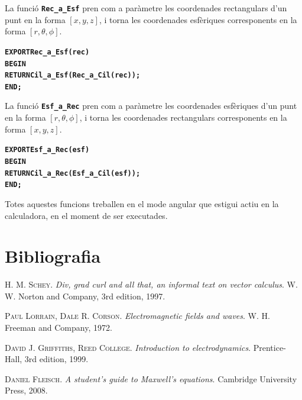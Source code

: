 \documentclass[catalan,a4paper,twoside,11pt]{article}
\begin{document}
La funció \texttt{\textbf{Rec\_a\_Esf}} pren com a paràmetre les coordenades rectangulars  d'un punt en la forma $[x,y,z]$, i torna les coordenades esfèriques corresponents en la forma $[r,\theta,\phi]$.
\vspace{-6mm}
\begin{alltt}
\bfseries
    EXPORT Rec\_a\_Esf(rec)
    BEGIN
      RETURN Cil\_a\_Esf(Rec\_a\_Cil(rec));
    END;
\end{alltt}

La funció \texttt{\textbf{Esf\_a\_Rec}} pren com a paràmetre les coordenades esfèriques d'un punt en la forma $[r,\theta,\phi]$, i torna les coordenades rectangulars corresponents en la forma $[x,y,z]$.
\vspace{-6mm}
\begin{alltt}
\bfseries
    EXPORT Esf\_a\_Rec(esf)
    BEGIN
      RETURN Cil\_a\_Rec(Esf\_a\_Cil(esf));
    END;
\end{alltt}


Totes aquestes funcions treballen en el mode angular que estigui actiu en la calculadora, en el moment de ser executades.



\section{Bibliografia}

\textsc{H. M. Schey}. \textsl{Div, grad curl and all that, an informal text on vector calculus}.  W. W. Norton and Company, 3rd edition, 1997.

\textsc{Paul Lorrain, Dale R. Corson}. \textsl{Electromagnetic fields and waves}.  W. H. Freeman and Company, 1972.

\textsc{David J. Griffiths, Reed College}. \textsl{Introduction to electrodynamics}. Prentice-Hall, 3rd edition, 1999.

\textsc{Daniel Fleisch}. \textsl{A student's guide to Maxwell's equations}. Cambridge University Press, 2008.
\end{document}
